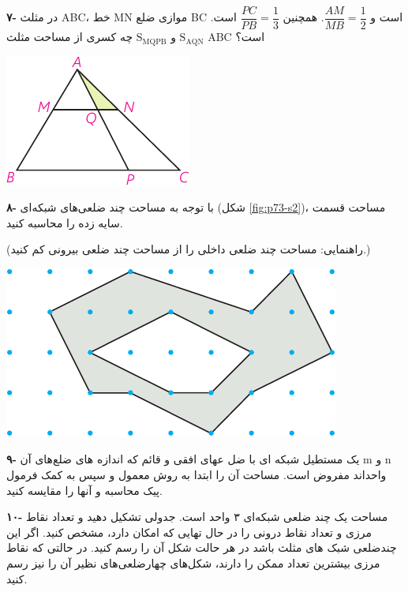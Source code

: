 \documentclass[12pt, a4paper]{book}
\newenvironment{Figure}
{\par\medskip\noindent\minipage{\linewidth}}
{\endminipage\par\medskip}
\begin{document}
\begin{multicols}{2}
\textbf{۷-}
در مثلث ABC، خط MN موازی ضلع BC است و 
$ \dfrac{AM}{MB} = \dfrac{1}{2} $.
همچنین 
$ \dfrac{PC}{PB} = \dfrac{1}{3} $
است. 
$ \mathrm{S}_{\mathrm{AQN}} $ و $\mathrm{S}_{\mathrm{MQPB}}$
چه کسری از مساحت مثلث ABC است؟

\begin{Figure}
	\centering
	\includegraphics[scale=1.2]{"Shapes/Fasl - 3/Dars 2/P73-S1.pdf"}
\end{Figure}

\bigskip
\textbf{۸-}
با توجه به مساحت چند ضلعی‌های شبکه‌ای
 (شکل \ref{fig:p73-s2})،
  مساحت قسمت سایه زده را محاسبه کنید.
{{\small (راهنمایی: مساحت چند ضلعی داخلی را از مساحت چند ضلعی بیرونی کم کنید.)}

\begin{Figure}
	\centering
	\includegraphics[width=0.9\linewidth]{"Shapes/Fasl - 3/Dars 2/P73-S2.pdf"}
	\label{fig:p73-s2}
\end{Figure}

\bigskip
\textbf{۹-}
یک مستطیل شبکه ای با ضل عهای افقی و قائم که اندازه های ضلع‌های آن m و n واحداند مفروض است. مساحت آن را ابتدا به روش معمول و سپس به کمک فرمول پیک محاسبه و آنها را مقایسه کنید.

\bigskip
\textbf{۱۰-}
مساحت یک چند ضلعی شبکه‌ای ۳ واحد است. جدولی تشکیل دهید و تعداد نقاط مرزی و تعداد نقاط درونی را در حال تهایی که امکان دارد، مشخص کنید. اگر این چندضلعی شبک های مثلث باشد در هر حالت شکل آن را رسم کنید. در حالتی که نقاط مرزی بیشترین تعداد ممکن را دارند، شکل‌های چهارضلعی‌های نظیر آن را نیز رسم کنید.

}\end{multicols}
\end{document}
